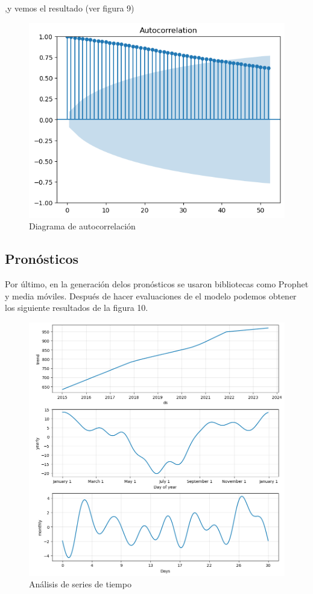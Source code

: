 \documentclass{article}
\begin{document}
,y vemos el resultado (ver figura 9)

\begin{figure}[h]
\centering
\includegraphics[width=0.65\linewidth]{Reports/images/auto.png}
\caption{\label{fig:auto}Diagrama de autocorrelación}
\end{figure}

\newpage
\subsection{Pronósticos}

Por último, en la generación delos pronósticos se usaron bibliotecas como Prophet y media móviles. Después de hacer evaluaciones de el modelo podemos obtener los siguiente resultados de la figura 10.

\begin{figure}[h]
\centering
\includegraphics[width=0.8\linewidth]{Reports/images/trend.png}
\caption{\label{fig:trend}Análisis de series de tiempo}
\end{figure}
\end{document}
